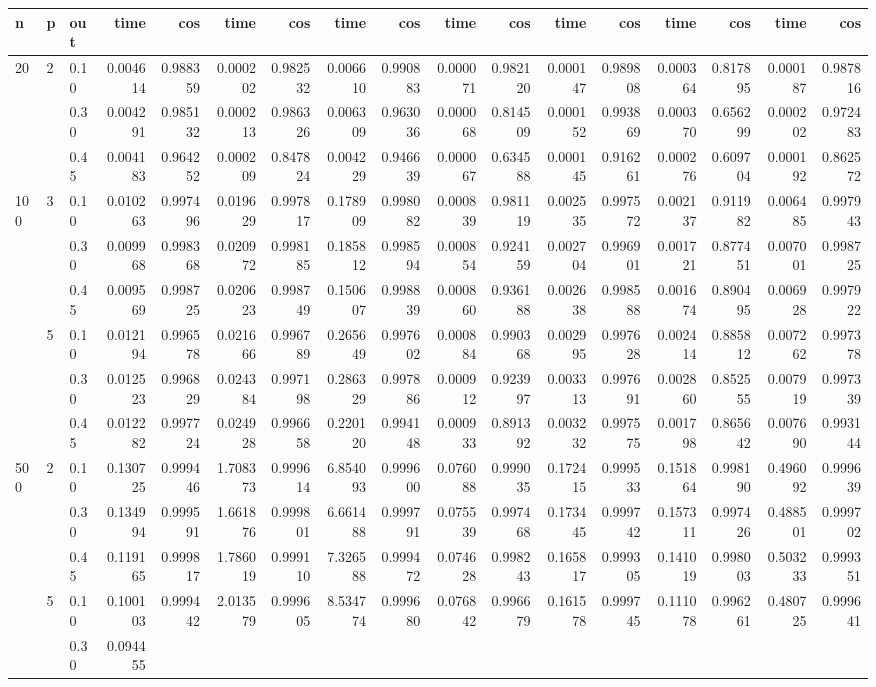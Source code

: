 \begin{table}[h!]
{\begin{adjustwidth}{-3cm}{0cm}
{\begin{tabular}{l|l|l|r|r|r|r|r|r|r|r|r|r|r|r|r|r|}
         n  & p  & out &      time &       cos &      time &       cos &      time &       cos &      time &       cos &      time &       cos &      time &       cos &      time &       cos \\
         \hline
        20  & 2 & 0.10 &  0.004614 &  0.988359 &  0.000202 &  0.982532 &  0.006610 &  0.990883 &  0.000071 &  0.982120 &  0.000147 &  0.989808 &  0.000364 &  0.817895 &  0.000187 &  0.987816 \\    &   & 0.30 &  0.004291 &  0.985132 &  0.000213 &  0.986326 &  0.006309 &  0.963036 &  0.000068 &  0.814509 &  0.000152 &  0.993869 &  0.000370 &  0.656299 &  0.000202 &  0.972483 \\    &   & 0.45 &  0.004183 &  0.964252 &  0.000209 &  0.847824 &  0.004229 &  0.946639 &  0.000067 &  0.634588 &  0.000145 &  0.916261 &  0.000276 &  0.609704 &  0.000192 &  0.862572 \\100 & 3 & 0.10 &  0.010263 &  0.997496 &  0.019629 &  0.997817 &  0.178909 &  0.998082 &  0.000839 &  0.981119 &  0.002535 &  0.997572 &  0.002137 &  0.911982 &  0.006485 &  0.997943 \\    &   & 0.30 &  0.009968 &  0.998368 &  0.020972 &  0.998185 &  0.185812 &  0.998594 &  0.000854 &  0.924159 &  0.002704 &  0.996901 &  0.001721 &  0.877451 &  0.007001 &  0.998725 \\    &   & 0.45 &  0.009569 &  0.998725 &  0.020623 &  0.998749 &  0.150607 &  0.998839 &  0.000860 &  0.936188 &  0.002638 &  0.998588 &  0.001674 &  0.890495 &  0.006928 &  0.997922 \\    & 5 & 0.10 &  0.012194 &  0.996578 &  0.021666 &  0.996789 &  0.265649 &  0.997602 &  0.000884 &  0.990368 &  0.002995 &  0.997628 &  0.002414 &  0.885812 &  0.007262 &  0.997378 \\    &   & 0.30 &  0.012523 &  0.996829 &  0.024384 &  0.997198 &  0.286329 &  0.997886 &  0.000912 &  0.923997 &  0.003313 &  0.997691 &  0.002860 &  0.852555 &  0.007919 &  0.997339 \\    &   & 0.45 &  0.012282 &  0.997724 &  0.024928 &  0.996658 &  0.220120 &  0.994148 &  0.000933 &  0.891392 &  0.003232 &  0.997575 &  0.001798 &  0.865642 &  0.007690 &  0.993144 \\500 & 2 & 0.10 &  0.130725 &  0.999446 &  1.708373 &  0.999614 &  6.854093 &  0.999600 &  0.076088 &  0.999035 &  0.172415 &  0.999533 &  0.151864 &  0.998190 &  0.496092 &  0.999639 \\    &   & 0.30 &  0.134994 &  0.999591 &  1.661876 &  0.999801 &  6.661488 &  0.999791 &  0.075539 &  0.997468 &  0.173445 &  0.999742 &  0.157311 &  0.997426 &  0.488501 &  0.999702 \\    &   & 0.45 &  0.119165 &  0.999817 &  1.786019 &  0.999110 &  7.326588 &  0.999472 &  0.074628 &  0.998243 &  0.165817 &  0.999305 &  0.141019 &  0.998003 &  0.503233 &  0.999351 \\    & 5 & 0.10 &  0.100103 &  0.999442 &  2.013579 &  0.999605 &  8.534774 &  0.999680 &  0.076842 &  0.996679 &  0.161578 &  0.999745 &  0.111078 &  0.996261 &  0.480725 &  0.999641 \\    &   & 0.30 &  0.094455 &  
\end{tabular}}
\end{adjustwidth}}
\end{table}

